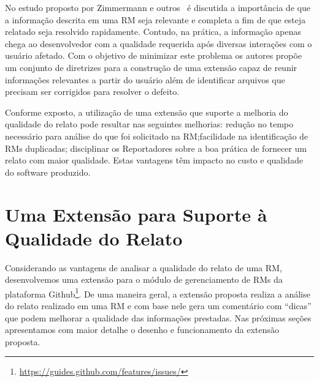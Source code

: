 No estudo proposto por Zimmermann e outros~\cite{5070993} é discutida a
importância de que a informação descrita em uma RM seja relevante e completa a
fim de que esteja relatado seja resolvido rapidamente. Contudo, na prática, a
informação apenas chega ao desenvolvedor com a qualidade requerida após diversas
interações com o usuário afetado. Com o objetivo de minimizar este problema os
autores propõe um conjunto de diretrizes para a construção de uma extensão capaz
de reunir informações relevantes a partir do usuário além de identificar
arquivos que precisam ser corrigidos para resolver o defeito.

Conforme exposto, a utilização de uma extensão que suporte a melhoria do
qualidade do relato pode resultar nas seguintes melhorias: redução no tempo
necessário para análise do que foi solicitado na RM;facilidade na identificação
de RMs duplicadas; disciplinar os Reportadores sobre a boa prática de fornecer
um relato com maior qualidade. Estas vantagens têm impacto no custo e qualidade
do software produzido.

\section{Uma Extensão para Suporte à Qualidade do Relato}
\label{sec:uma_extensao_suporte_qualidade_relato}

Considerando as vantagens de analisar a qualidade do relato de uma RM,
desenvolvemos uma extensão para o módulo de gerenciamento de RMs da plataforma
Github\footnote{\url{https://guides.github.com/features/issues/}}. De uma
maneira geral, a extensão proposta realiza a análise do relato realizado em uma
RM e com base nele gera um comentário com ``dicas'' que podem melhorar a
qualidade das informações prestadas. Nas próximas seções apresentamos com maior
detalhe o desenho e funcionamento da extensão proposta.


